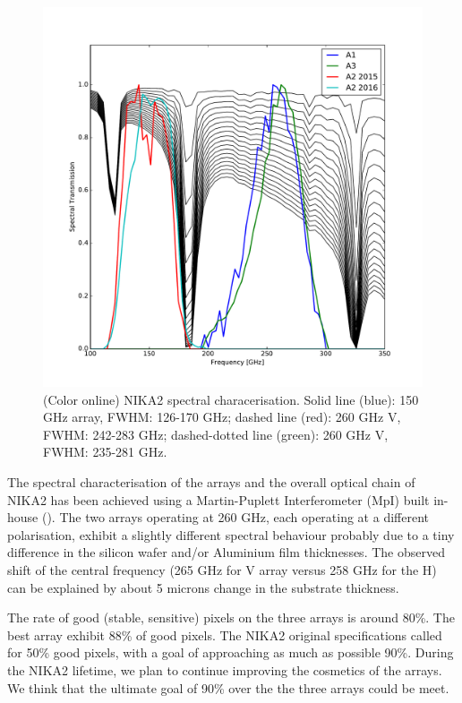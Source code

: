 \documentclass[]{aa} %
\begin{document}
\begin{figure}[h]
   \centering
    \includegraphics[width=0.9\linewidth]{atm_transmission.pdf}
     
      \caption{(Color online) NIKA2 spectral characerisation. Solid line (blue): 150 GHz array, FWHM: 126-170 GHz; dashed line (red): 260 GHz V, FWHM: 242-283 GHz; dashed-dotted line (green): 260 GHz V, FWHM: 235-281 GHz.}
         \label{Fig4}
\end{figure}

The spectral characterisation of the arrays and the overall optical chain of NIKA2 has been achieved using a Martin-Puplett Interferometer (MpI) built in-house (\cite{Durand2008}). The two arrays operating at 260 GHz, each operating at a different polarisation, exhibit a slightly different spectral behaviour probably due to a tiny difference in the silicon wafer and/or Aluminium film thicknesses. The observed shift of the central frequency (265 GHz for V array versus 258 GHz for the H) can be explained by about 5 microns change in the substrate thickness.

The rate of good (stable, sensitive) pixels on the three arrays is around 80\%. The best array exhibit 88\% of good pixels. The NIKA2 original specifications called for 50\% good pixels, with a goal of approaching as much as possible 90\%. During the NIKA2 lifetime, we plan to continue improving the cosmetics of the arrays. We think that the ultimate goal of 90\% over the the three arrays could be meet.
\end{document}
